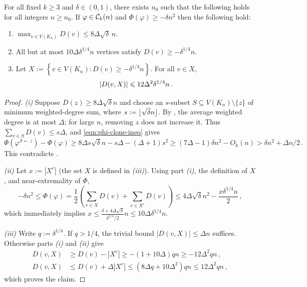 \begin{lemma}\label{lemma:D-tails}
For all fixed $k\geq3$ and $\delta\in(0,1)$, there exists $n_0$ such that the following holds for all integers $n\geq n_0$. If $\varphi\in{\mathcal C}_k(n)$ and $\Phi(\varphi)\geq-\delta n^2$ then the following hold:
\begin{enumerate}[
  label=\textit{(\roman*)},
  ref=(\textit{\roman*}),
  topsep=5pt
]
	\item\label{item:lemma:D-tails-i} $\max_{v\in V(K_n)}D(v)\leq8\Delta\sqrt{\delta}\,n$.
	\item\label{item:lemma:D-tails-ii} All but at most $10\Delta\delta^{1/4}n$ vertices satisfy $D(v)\geq-\delta^{1/4}n$.
	\item\label{item:lemma:D-tails-iii} Let $X:=\left\{v\in V(K_n):D(v)\geq-\delta^{1/4} n\right\}$. For all $v\in X$,
    $$\lvert D(v,X)\rvert \leqslant 12\Delta^2\delta^{1/4}n\,.$$
\end{enumerate}
\end{lemma}
\begin{proof}
{\it(i)} Suppose $D(z)\geq8\Delta\sqrt\delta n$ and choose an $s$-subset $S\subseteq V(K_n)\setminus\{z\}$ of minimum weighted-degree sum, where $s:=\lfloor\sqrt\delta n\rfloor$. By , the average weighted degree is at most $\Delta$; for large $n$, removing $z$ does not increase it. Thus $\sum_{v\in S}D(v)\leq s\Delta$, and \eqref{eqn:phi-clone-ineq} gives
$$\Phi(\varphi^{S\gets z})-\Phi(\varphi)\geq8\Delta s\sqrt\delta n-s\Delta-(\Delta+1)s^2\geq(7\Delta-1)\delta n^2-O_k(n)>\delta n^2+\Delta n/2\,.$$
This contradicts .

{\it(ii)} Let $x:=|X^c|$ (the set $X$ is defined in {\it(iii)}). Using part {\it(i)}, the definition of $X$, and near-extremality of $\Phi$,
$$-\delta n^2\leq\Phi(\varphi)=\frac{1}{2}\left(\sum_{v\in X}D(v)+\sum_{v\in X^c}D(v)\right)\leq 4\Delta\sqrt{\delta}n^2-\frac{x\delta^{1/4} n}{2}\,,$$
which immediately implies $x\leq\frac{\delta+4\Delta\sqrt{\delta}}{\delta^{1/4}/2}n\leq10\Delta\delta^{1/4}n$.

{\it(iii)} Write $q:=\delta^{1/4}$. If $q>1/4$, the trivial bound $|D(v,X)|\leq\Delta n$ suffices. Otherwise parts {\it(i)} and {\it(ii)} give
\begin{align*}
D(v,X)&\geq D(v)-|X^c|\geq-(1+10\Delta)qn\geq-12\Delta^2qn\,,\\
D(v,X)&\leq D(v)+\Delta|X^c|\leq(8\Delta q+10\Delta^2)qn\leq12\Delta^2qn\,,
\end{align*}
which proves the claim.
\end{proof}

